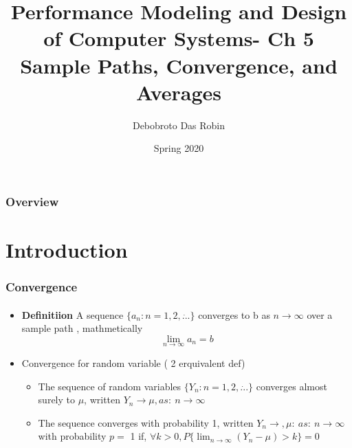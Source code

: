 \documentclass{beamer}
\title{Performance Modeling and
Design of Computer Systems- Ch 5 \\
Sample Paths, Convergence,
and Averages
}
\author{Debobroto Das Robin} %
\institute{Kent State University}
\date{Spring 2020}
\begin{document}
\begin{frame}
        \titlepage
        \begin{center}
    \href{mailto:drobin@kent.edu}{}
        \end{center}
\end{frame}

\begin{frame}
\frametitle{Overview} %
\tableofcontents %
\end{frame}



\section{Introduction}


\begin{frame}
\frametitle{Convergence}
\framesubtitle{\textbf{\textit{}}}
\begin{itemize}
\item \textbf{Definitiion}  A sequence $\{a_n : n = 1, 2, \dot{...}\}$ converges to b as $ n \rightarrow \infty$ over a sample path , mathmetically
$$\lim_{n\to\infty} a_n = b$$
\item Convergence for random variable ( 2 erquivalent def)
	\begin{itemize}
	\item The sequence of random variables $\{Y_n : n = 1, 2, \dot{...}\}$ 			converges almost surely to $\mu$, written
			$Y_n \rightarrow \mu , as :\ n \rightarrow \infty$
	\item  The sequence converges with probability 1, written
			$Y_n \rightarrow ,\mu :\ as :\ n \rightarrow \infty$ with 							probability $p =$  1
		if, $\forall k > 0, P \{ \lim_{n \rightarrow \infty} ( Y_n - \mu)> k\}= 0$

	\end{itemize}
\end{itemize}
	
\end{frame}
\end{document}
